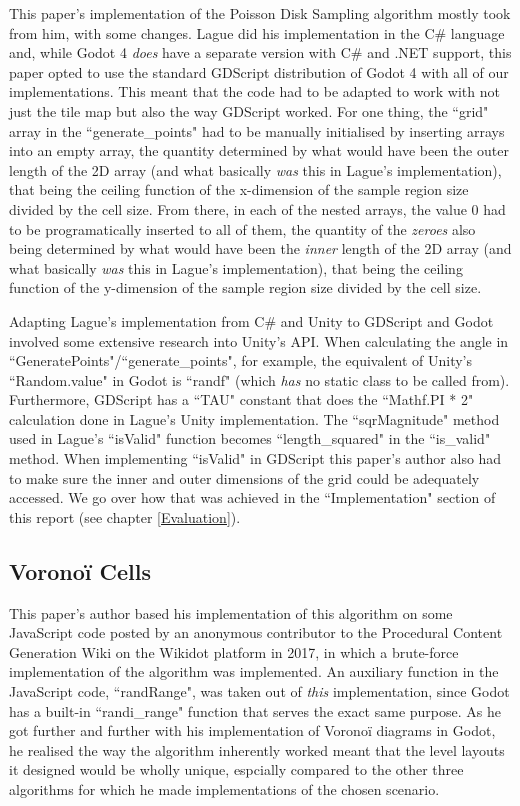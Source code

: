 This paper's implementation of the Poisson Disk Sampling algorithm mostly took from him, with some changes. Lague did his implementation in the C\# language and, while Godot 4 \textit{does} have a separate version with C\# and .NET support, this paper opted to use the standard GDScript distribution of Godot 4 with all of our implementations. This meant that the code had to be adapted to work with not just the tile map but also the way GDScript worked. For one thing, the ``grid" array in the ``generate\_points" had to be manually initialised by inserting arrays into an empty array, the quantity determined by what would have been the outer length of the 2D array (and what basically \textit{was} this in Lague's implementation), that being the ceiling function of the x-dimension of the sample region size divided by the cell size. From there, in each of the nested arrays, the value 0 had to be programatically inserted to all of them, the quantity of the \textit{zeroes} also being determined by what would have been the \textit{inner} length of the 2D array (and what basically \textit{was} this in Lague's implementation), that being the ceiling function of the y-dimension of the sample region size divided by the cell size.

Adapting Lague's implementation from C\# and Unity to GDScript and Godot involved some extensive research into Unity's API. When calculating the angle in ``GeneratePoints"/``generate\_points", for example, the equivalent of Unity's ``Random.value" in Godot is ``randf" (which \textit{has} no static class to be called from). Furthermore, GDScript has a ``TAU" constant that does the ``Mathf.PI * 2" calculation done in Lague's Unity implementation. The ``sqrMagnitude" method used in Lague's ``isValid" function becomes ``length\_squared" in the ``is\_valid" method. When implementing ``isValid" in GDScript this paper's author also had to make sure the inner and outer dimensions of the grid could be adequately accessed. We go over how that was achieved in the ``Implementation" section of this report (see chapter \ref{Evaluation}).

\subsection{Voronoï Cells} \label{voronoi1}

This paper's author based his implementation of this algorithm on some JavaScript code posted by an anonymous contributor to the Procedural Content Generation Wiki on the Wikidot platform in 2017, in which a brute-force implementation of the algorithm was implemented.\cite{pcgwikivoronoi} An auxiliary function in the JavaScript code, ``randRange", was taken out of \textit{this} implementation, since Godot has a built-in ``randi\_range" function that serves the exact same purpose.\cite{gdscriptdocs} As he got further and further with his implementation of Voronoï diagrams in Godot, he realised the way the algorithm inherently worked meant that the level layouts it designed would be wholly unique, espcially compared to the other three algorithms for which he made implementations of the chosen scenario.

